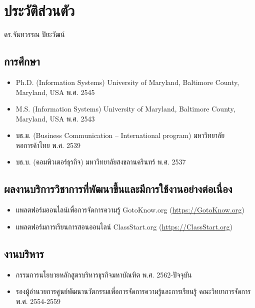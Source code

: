 \chapter{ประวัติส่วนตัว}

ดร.จันทวรรณ ปิยะวัฒน์

\section*{การศึกษา}

\begin{tcolorbox}[breakable,enhanced,fonttitle=\bfseries]
\begin{itemize}
	\item Ph.D. (Information Systems) University of Maryland, Baltimore County, Maryland, USA พ.ศ. 2545
	\item M.S. (Information Systems) University of Maryland, Baltimore County, Maryland, USA พ.ศ. 2543
	\item บธ.ม. (Business Communication – International program) มหาวิทยาลัยหอการค้าไทย พ.ศ. 2539
	\item บธ.บ. (คอมพิวเตอร์ธุรกิจ) มหาวิทยาลัยสงขลานครินทร์ พ.ศ. 2537
\end{itemize}
\end{tcolorbox}
\vspace{1.5cm}

\section*{ผลงานบริการวิชาการที่พัฒนาขึ้นและมีการใช้งานอย่างต่อเนื่อง}

\begin{tcolorbox}[breakable,enhanced,fonttitle=\bfseries]
\begin{itemize}
	\item แพลตฟอร์มออนไลน์เพื่อการจัดการความรู้ GotoKnow.org (\url{https://GotoKnow.org})
	\item แพลตฟอร์มการเรียนการสอนออนไลน์ ClassStart.org (\url{https://ClassStart.org})
\end{itemize}
\end{tcolorbox}
\vspace{1.5cm}

\section*{งานบริหาร}

\begin{tcolorbox}[breakable,enhanced,fonttitle=\bfseries]
\begin{itemize}
	\item กรรมการนโยบายหลักสูตรบริหารธุรกิจมหาบัณฑิต พ.ศ. 2562-ปัจจุบัน 
	\item รองผู้อำนวยการศูนย์พัฒนานวัตกรรมเพื่อการจัดการความรู้และการเรียนรู้ คณะวิทยาการจัดการ  พ.ศ. 2554-2559 
\end{itemize}
\end{tcolorbox}
\vspace{1.5cm}

